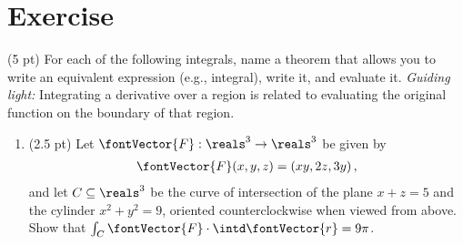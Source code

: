 %
%
%
%
\section{Exercise}

(5 pt) For each of the following integrals, name a theorem that allows you to write an equivalent expression (e.g., integral), write it, and evaluate it. \emph{Guiding light:} Integrating a derivative over a region is related to evaluating the original function on the boundary of that region.
\begin{enumerate}[label=(\alph*)]%
\item (2.5 pt) Let $\fontVector{F}: \reals^{3} \rightarrow \reals^{3}$ be given by
\begin{align*}
\fontVector{F}(x,y,z)
=
\left(x y,2 z,3 y\right),
\end{align*}
and let $C \subseteq \reals^{3}$ be the curve of intersection of the plane $x + z = 5$ and the cylinder $x^{2} + y^{2} = 9$, oriented counterclockwise when viewed from above. Show that $\int_{C} \fontVector{F} \cdot \intd \fontVector{r} = 9 \pi$.
\end{enumerate}

